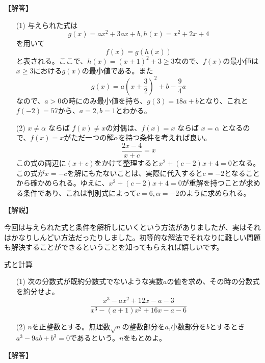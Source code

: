 \documentclass[a4paper,fleqn,dvipdfmx]{jsarticle}
\begin{document}
\begin{flushleft}
【解答】
\end{flushleft}

\begin{itemize}
    \item [(1)] 与えられた式は
    $$g(x)=ax^2+3ax+b,h(x)=x^2+2x+4$$
    を用いて
    $$f(x)=g(h(x))$$
    と表される。ここで、$h(x)=(x+1)^2+3\geq 3$なので、$f(x)$の最小値は$x\geq 3$における$g(x)$の最小値である。また
    $$g(x)=a\left(x+\frac{3}{2}\right)^2+b-\frac{9}{4}a$$
    なので、$a>0$の時にのみ最小値を持ち、$g(3)=18a+b$となり、これと$f(-2)=57$から、$a=2,b=1$とわかる。
    \item [(2)] $x \neq \alpha$ ならば $f(x) \neq x$の対偶は、$f(x)=x$ ならば $x=\alpha$ となるので、$f(x)=x$がただ一つの解$\alpha$を持つ条件を考えれば良い。
    $$\frac{2x-4}{x+c}=x$$
    この式の両辺に$(x+c)$をかけて整理すると$x^2+(c-2)x+4=0$となる。この式が$x=-c$を解にもたないことは、実際に代入すると$c=-2$となることから確かめられる。ゆえに、$x^2+(c-2)x+4=0$が重解を持つことが求める条件であり、これは判別式によって$c=6,\alpha=-2$のように求められる。
    
\end{itemize}

\begin{flushleft}
    【解説】
\end{flushleft}

今回は与えられた式と条件を解析しにいくという方法がありましたが、実はそれはかなりしんどい方法だったりしました。初等的な解法でそれなりに難しい問題も解決することができるということを知ってもらえれば嬉しいです。


\newpage
\begin{itembox}[l]{式と計算}
\begin{itemize}
    \item [(1)] 次の分数式が既約分数式でないような実数$a$の値を求め、その時の分数式を約分せよ。
    $$\frac{x^3-ax^2+12x-a-3}{x^3-(a+1)x^2+16x-a-6}$$
    \item [(2)] $n$を正整数とする。無理数$\sqrt{n}$の整数部分を$a$,小数部分を$b$とするとき$a^3-9ab+b^3=0$であるという。$n$をもとめよ。
\end{itemize}
\end{itembox}

\begin{flushleft}
【解答】
\end{flushleft}
\end{document}
